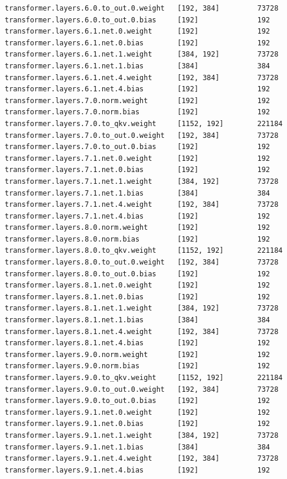 \documentclass[notitlepage,cs4size,punct,oneside]{ctexrep}
\numberwithin{equation}{chapter}
\theoremstyle{mystyle}
\begin{document}
\begin{appendices}
{\begin{lstlisting}[style=output]
transformer.layers.6.0.to_out.0.weight   [192, 384]         73728
transformer.layers.6.0.to_out.0.bias     [192]              192
transformer.layers.6.1.net.0.weight      [192]              192
transformer.layers.6.1.net.0.bias        [192]              192
transformer.layers.6.1.net.1.weight      [384, 192]         73728
transformer.layers.6.1.net.1.bias        [384]              384
transformer.layers.6.1.net.4.weight      [192, 384]         73728
transformer.layers.6.1.net.4.bias        [192]              192
transformer.layers.7.0.norm.weight       [192]              192
transformer.layers.7.0.norm.bias         [192]              192
transformer.layers.7.0.to_qkv.weight     [1152, 192]        221184
transformer.layers.7.0.to_out.0.weight   [192, 384]         73728
transformer.layers.7.0.to_out.0.bias     [192]              192
transformer.layers.7.1.net.0.weight      [192]              192
transformer.layers.7.1.net.0.bias        [192]              192
transformer.layers.7.1.net.1.weight      [384, 192]         73728
transformer.layers.7.1.net.1.bias        [384]              384
transformer.layers.7.1.net.4.weight      [192, 384]         73728
transformer.layers.7.1.net.4.bias        [192]              192
transformer.layers.8.0.norm.weight       [192]              192
transformer.layers.8.0.norm.bias         [192]              192
transformer.layers.8.0.to_qkv.weight     [1152, 192]        221184
transformer.layers.8.0.to_out.0.weight   [192, 384]         73728
transformer.layers.8.0.to_out.0.bias     [192]              192
transformer.layers.8.1.net.0.weight      [192]              192
transformer.layers.8.1.net.0.bias        [192]              192
transformer.layers.8.1.net.1.weight      [384, 192]         73728
transformer.layers.8.1.net.1.bias        [384]              384
transformer.layers.8.1.net.4.weight      [192, 384]         73728
transformer.layers.8.1.net.4.bias        [192]              192
transformer.layers.9.0.norm.weight       [192]              192
transformer.layers.9.0.norm.bias         [192]              192
transformer.layers.9.0.to_qkv.weight     [1152, 192]        221184
transformer.layers.9.0.to_out.0.weight   [192, 384]         73728
transformer.layers.9.0.to_out.0.bias     [192]              192
transformer.layers.9.1.net.0.weight      [192]              192
transformer.layers.9.1.net.0.bias        [192]              192
transformer.layers.9.1.net.1.weight      [384, 192]         73728
transformer.layers.9.1.net.1.bias        [384]              384
transformer.layers.9.1.net.4.weight      [192, 384]         73728
transformer.layers.9.1.net.4.bias        [192]              192

\end{lstlisting}}
\end{appendices}
\end{document}
